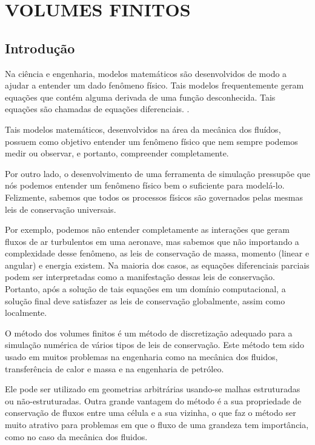 \chapter[VOLUMES FINITOS]{VOLUMES FINITOS}

\section{Introdução}

Na ciência e engenharia, modelos matemáticos são desenvolvidos de modo a ajudar a entender um dado fenômeno físico. Tais modelos frequentemente geram equações que contém alguma derivada de uma função desconhecida. Tais equações são chamadas de equações diferenciais. \cite{NagleR.KentB.SaffEdwardDavidSnider2012}.

Tais modelos matemáticos, desenvolvidos na área da mecânica dos fluídos, possuem como objetivo entender um fenômeno físico que nem sempre podemos medir ou observar, e portanto, compreender completamente. \cite{book}

Por outro lado, o desenvolvimento de uma ferramenta de simulação pressupõe que nós podemos entender um fenômeno físico bem o suficiente para modelá-lo. Felizmente, sabemos que todos os processos físicos são governados pelas mesmas leis de conservação universais.

Por exemplo, podemos não entender completamente as interações que geram fluxos de ar turbulentos em uma aeronave, mas sabemos que não importando a complexidade desse fenômeno, as leis de conservação de massa, momento (linear e angular) e energia existem.
Na maioria dos casos, as equações diferenciais parciais podem ser interpretadas como a manifestação dessas leis de conservação. Portanto, após a solução de tais equações em um domínio computacional, a solução final deve satisfazer as leis de conservação globalmente, assim como localmente.

O método dos volumes finitos é um método de discretização adequado para a simulação numérica de vários tipos de leis de conservação. Este método tem sido usado em muitos problemas na engenharia como na mecânica dos fluidos, transferência de calor e massa e na engenharia de petróleo.

Ele pode ser utilizado em geometrias arbitrárias usando-se malhas estruturadas ou não-estruturadas. Outra grande vantagem do método é a sua propriedade de conservação de fluxos entre uma célula e a sua vizinha, o que faz o método ser muito atrativo para problemas em que o fluxo de uma grandeza tem importância, como no caso da mecânica dos fluidos.

